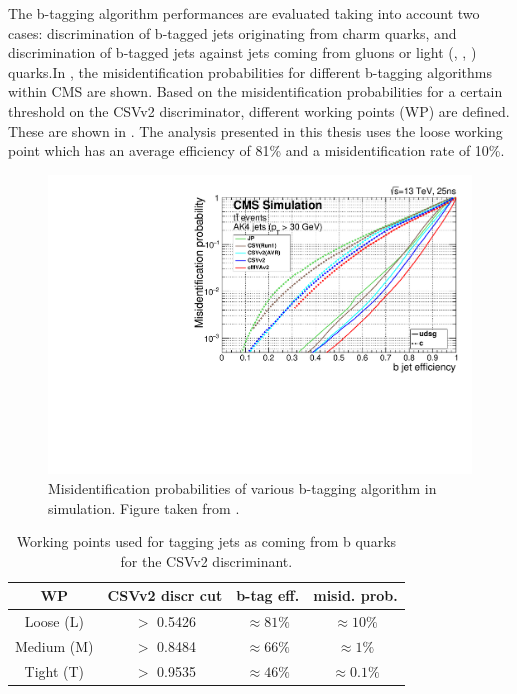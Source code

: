 The b-tagging algorithm performances are evaluated taking into account two cases: discrimination of b-tagged jets originating from charm quarks, and discrimination of b-tagged jets against jets coming from gluons or light (\Pup, \Pdown, \Pstrange) quarks.In , the misidentification probabilities for different b-tagging algorithms within CMS are shown.
Based on the misidentification probabilities for a certain threshold on the CSVv2 discriminator, different working points (WP) are defined. These are shown in . The analysis presented in this thesis uses the loose working point which has an average efficiency of 81\% and a misidentification rate of 10\%. 
\begin{figure}[htbp]
	\centering
	\includegraphics[width=0.7\linewidth]{4_EventRecoSelect/Figures/Figure_008}
	\caption{Misidentification probabilities of various b-tagging algorithm in simulation. Figure taken from \cite{CMS-PAS-BTV-15-001}. }
	\label{fig:figure008}
\end{figure}
\begin{table}[htbp]
	\centering
	\caption{Working points used for tagging jets as coming from b quarks for the CSVv2 discriminant.}
	\begin{tabular}{cccc}
		\toprule
		WP  & CSVv2 discr cut & b-tag eff. & misid. prob. \\ 
		\midrule
		Loose (L) & $>$ 0.5426 & $\approx 81\%$ &  $\approx 10\%$ \\ 
	
		Medium (M)& $>$ 0.8484 & $\approx 66\%$ &  $\approx 1\%$\\ 
		
		Tight (T) & $>$ 0.9535 & $\approx 46\%$ &  $\approx 0.1\%$\\ 
		\bottomrule
	\end{tabular} 
	\label{tab:bctag}	
\end{table}

